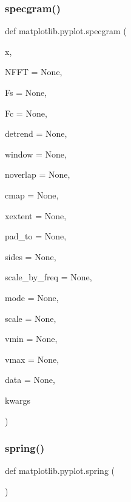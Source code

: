 \subsubsection{\texorpdfstring{specgram()}{specgram()}}
{\footnotesize\ttfamily def matplotlib.\+pyplot.\+specgram (\begin{DoxyParamCaption}\item[{}]{x,  }\item[{}]{N\+F\+FT = {\ttfamily None},  }\item[{}]{Fs = {\ttfamily None},  }\item[{}]{Fc = {\ttfamily None},  }\item[{}]{detrend = {\ttfamily None},  }\item[{}]{window = {\ttfamily None},  }\item[{}]{noverlap = {\ttfamily None},  }\item[{}]{cmap = {\ttfamily None},  }\item[{}]{xextent = {\ttfamily None},  }\item[{}]{pad\+\_\+to = {\ttfamily None},  }\item[{}]{sides = {\ttfamily None},  }\item[{}]{scale\+\_\+by\+\_\+freq = {\ttfamily None},  }\item[{}]{mode = {\ttfamily None},  }\item[{}]{scale = {\ttfamily None},  }\item[{}]{vmin = {\ttfamily None},  }\item[{}]{vmax = {\ttfamily None},  }\item[{}]{data = {\ttfamily None},  }\item[{}]{kwargs }\end{DoxyParamCaption})}

\mbox{\label{namespacematplotlib_1_1pyplot_a8bcb9fa7d4ea5b0f02e94aa67e22bb47}} 
\subsubsection{\texorpdfstring{spring()}{spring()}}
{\footnotesize\ttfamily def matplotlib.\+pyplot.\+spring (\begin{DoxyParamCaption}{ }\end{DoxyParamCaption})}

\mbox{\label{namespacematplotlib_1_1pyplot_a32b63653836f297eda0b70ce1cd209b2}} 
